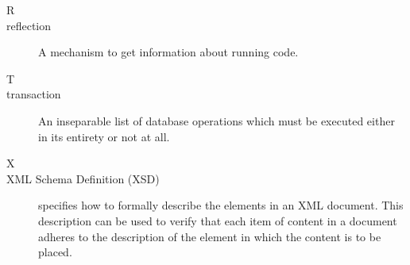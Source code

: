 \begin{description}
\item[\Large{R}]
	\item[reflection] A mechanism to get information about running code.

\item[\Large{T}]
	\item[transaction] An inseparable list of database operations which must be executed either in its entirety or not at all.
	
\item[\Large{X}]
	\item[XML Schema Definition (XSD)] specifies how to formally describe the elements in an XML document. This description can be used to verify that each item of content in a document adheres to the description of the element in which the content is to be placed.

\end{description}

